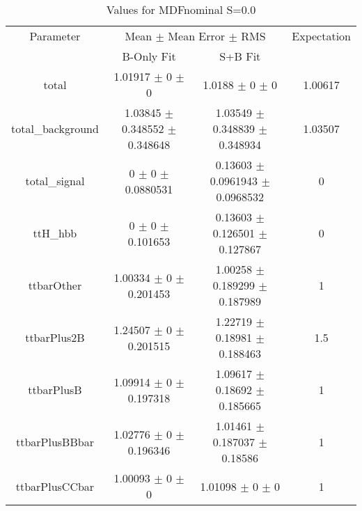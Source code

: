 \begin{table}
\centering
\caption{Values for MDFnominal S=0.0}
\begin{tabular}{cccc}
\toprule
Parameter & \multicolumn{2}{c}{Mean $\pm$ Mean Error $\pm$ RMS} & Expectation\\
 & B-Only Fit & S+B Fit & \\
\midrule
total & \num{1.01917} $\pm$ \num{0} $\pm$ \num{0} & \num{1.0188} $\pm$ \num{0} $\pm$ \num{0} & \num{1.00617}\\
total\_background & \num{1.03845} $\pm$ \num{0.348552} $\pm$ \num{0.348648} & \num{1.03549} $\pm$ \num{0.348839} $\pm$ \num{0.348934} & \num{1.03507}\\
total\_signal & \num{0} $\pm$ \num{0} $\pm$ \num{0.0880531} & \num{0.13603} $\pm$ \num{0.0961943} $\pm$ \num{0.0968532} & \num{0}\\
ttH\_hbb & \num{0} $\pm$ \num{0} $\pm$ \num{0.101653} & \num{0.13603} $\pm$ \num{0.126501} $\pm$ \num{0.127867} & \num{0}\\
ttbarOther & \num{1.00334} $\pm$ \num{0} $\pm$ \num{0.201453} & \num{1.00258} $\pm$ \num{0.189299} $\pm$ \num{0.187989} & \num{1}\\
ttbarPlus2B & \num{1.24507} $\pm$ \num{0} $\pm$ \num{0.201515} & \num{1.22719} $\pm$ \num{0.18981} $\pm$ \num{0.188463} & \num{1.5}\\
ttbarPlusB & \num{1.09914} $\pm$ \num{0} $\pm$ \num{0.197318} & \num{1.09617} $\pm$ \num{0.18692} $\pm$ \num{0.185665} & \num{1}\\
ttbarPlusBBbar & \num{1.02776} $\pm$ \num{0} $\pm$ \num{0.196346} & \num{1.01461} $\pm$ \num{0.187037} $\pm$ \num{0.18586} & \num{1}\\
ttbarPlusCCbar & \num{1.00093} $\pm$ \num{0} $\pm$ \num{0} & \num{1.01098} $\pm$ \num{0} $\pm$ \num{0} & \num{1}\\
\bottomrule
\end{tabular}
\end{table}